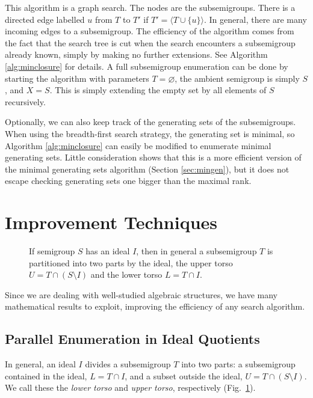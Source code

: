 \documentclass{amsart}
\newcommand{\todo}[1]{\textcolor{red}{ \small \textsf{[ #1 ]} \normalsize}}
\theoremstyle{plain}
\theoremstyle{definition}
\begin{document}
This algorithm is a graph search.
The nodes are the subsemigroups.
There is a directed edge labelled $u$ from $T$ to $T'$ if $T'=\langle T\cup\{u\}\rangle$.
In general, there are many incoming edges to a subsemigroup.
The efficiency of the algorithm  comes from the fact that the search tree is cut when the search encounters a subsemigroup already known, simply by making no further extensions.
See Algorithm \ref{alg:minclosure} for details.
A full subsemigroup enumeration can be done by starting the algorithm with parameters $T=\varnothing$, the ambient semigroup is simply $S$, and  $X=S$.
This is simply extending the empty set by all elements of $S$ recursively.

Optionally, we can also keep track of the generating sets of the subsemigroups.
When using the breadth-first search strategy, the generating set is minimal, so Algorithm \ref{alg:minclosure} can easily be modified to enumerate minimal generating sets.
Little consideration shows that this is a more efficient version of the minimal generating sets algorithm (Section \ref{sec:mingen}), but it does not escape checking generating sets one bigger than the maximal rank.


\section{Improvement Techniques}
\label{sec:techniques}

\begin{figure}[t]
\begin{center}

\caption{If semigroup $S$ has an ideal $I$, then in general a subsemigroup $T$ is partitioned into two parts by the ideal, the upper torso $U=T\cap (S\setminus I)$ and the lower torso $L=T\cap I$.}
\label{fig:torsos}
\end{center}
\end{figure}

Since we are dealing with well-studied algebraic structures, we have many mathematical results to exploit, improving the efficiency of any  search algorithm.
\subsection{Parallel Enumeration in Ideal Quotients}
\label{sec:idealparallel}
In general, an ideal $I$ divides a subsemigroup $T$ into two parts: a subsemigroup contained in the ideal, $L=T\cap I$, and a subset outside the ideal, $U=T\cap (S\setminus I)$. We call these the \emph{lower torso} and \emph{upper torso}, respectively (Fig.\ \ref{fig:torsos}).
\end{document}
